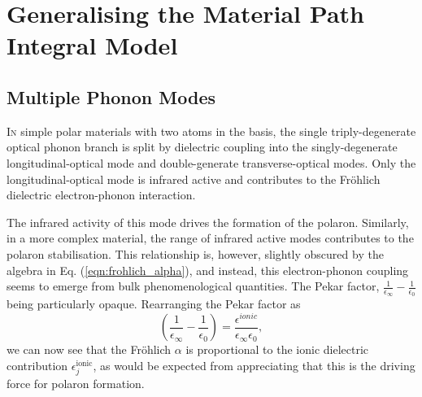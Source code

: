 \chapter{Generalising the Material Path Integral Model}
\label{chap:3}



\section{Multiple Phonon Modes}
\label{sec:3-1}

\lettrine{I}n simple polar materials with two atoms in the basis, the single triply-degenerate optical phonon branch is split by dielectric coupling into the singly-degenerate longitudinal-optical mode and double-generate transverse-optical modes. Only the longitudinal-optical mode is infrared active and contributes to the Fr\"ohlich dielectric electron-phonon interaction. 

The infrared activity of this mode drives the formation of the polaron. Similarly, in a more complex material, the range of infrared active modes contributes to the polaron stabilisation. This relationship is, however, slightly obscured by the algebra in Eq. (\ref{eqn:frohlich_alpha}), and instead, this electron-phonon coupling seems to emerge from bulk phenomenological quantities. The Pekar factor, $\frac{1}{\epsilon_{\infty}}-\frac{1}{\epsilon_{0}}$ being particularly opaque. Rearranging the Pekar factor as
\begin{equation}
    \left( \frac{1}{\epsilon_{\infty}} - \frac{1}{\epsilon_{0}} \right) = \frac{\epsilon^{ionic}}{\epsilon_{\infty}\epsilon_{0}},
    \label{eqn:pekar}
\end{equation}
we can now see that the Fr\"ohlich $\alpha$ is proportional to the ionic dielectric contribution $\epsilon^{\text{ionic}}_j$, as would be expected from appreciating that this is the driving force for polaron formation. 

